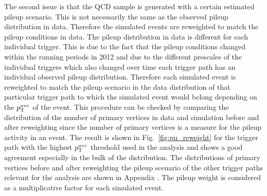 The second issue is that the QCD sample is generated with a certain estimated pileup scenario. This is not necessarily the same as the observed pileup distribution in data. Therefore the simulated events are reweighted to match the pileup conditions in data. The pileup distribution in data is different for each individual trigger. This is due to the fact that the pileup conditions changed within the running periods in 2012 and due to the different prescales of the individual triggers which also changed over time each trigger path has an individual observed pileup distribution. Therefore each simulated event is reweighted to match the pileup scenario in the data distribution of that particular trigger path to which the simulated event would belong depending on the $p_{\text{T}}^{ave}$ of the event. This procedure can be checked by comparing the distribution of the number of primary vertices in data and simulation before and after reweighting since the number of primary vertices is a measure for the pileup activity in an event. The result is shown in Fig.~\ref{fig:pu_reweight} for the trigger path with the highest $p_{\text{T}}^{ave}$ threshold used in the analysis and shows a good agreement especially in the bulk of the distribution. The distributions of primary vertices before and after reweighting the pileup scenario of the other trigger paths relevant for the analysis are shown in Appendix . The pileup weight is considered as a multiplicative factor for each simulated event.
